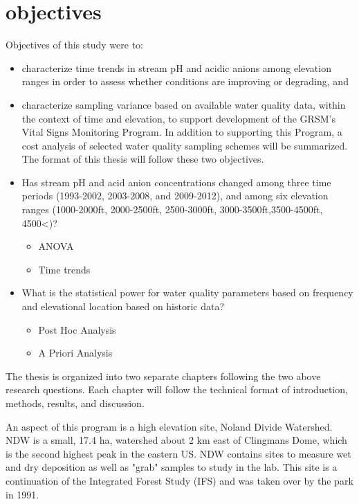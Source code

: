 \section{objectives}
Objectives of this study were to:
\begin{itemize}
\item  characterize time trends in stream pH and acidic anions among elevation ranges in order to assess whether conditions are improving or degrading, and 
\item characterize sampling variance based on available water quality data, within the context of time and elevation, to support development of the GRSM’s Vital Signs Monitoring Program.  In addition to supporting this Program, a cost analysis of selected water quality sampling schemes will be summarized.  The format of this thesis will follow these two objectives.  
\end{itemize}
\begin{itemize}
\item Has stream pH and acid anion concentrations changed among three time periods (1993-2002, 2003-2008, and 2009-2012), and among six elevation ranges (1000-2000ft, 2000-2500ft, 2500-3000ft, 3000-3500ft,3500-4500ft, 4500<)?
\begin{itemize}
 \item ANOVA
\item Time trends
\end{itemize}
\item What is the statistical power for water quality parameters based on frequency and elevational location based on historic data?
\begin{itemize}
\item Post Hoc Analysis
\item A Priori Analysis
\end{itemize}
\end{itemize}
The thesis is organized into two separate chapters following the two above research questions. Each chapter will follow the technical format of introduction, methods, results, and discussion. 







An aspect of this program is a high elevation site, Noland Divide Watershed.  
NDW is a small, 17.4 ha, watershed about 2 km east of Clingmans Dome, which is the second highest peak in the eastern US.  
NDW contains sites to measure wet and dry deposition as well as "grab" samples to study in the lab.  
This site is a continuation of the Integrated Forest Study (IFS) and was taken over by the park in 1991.  







